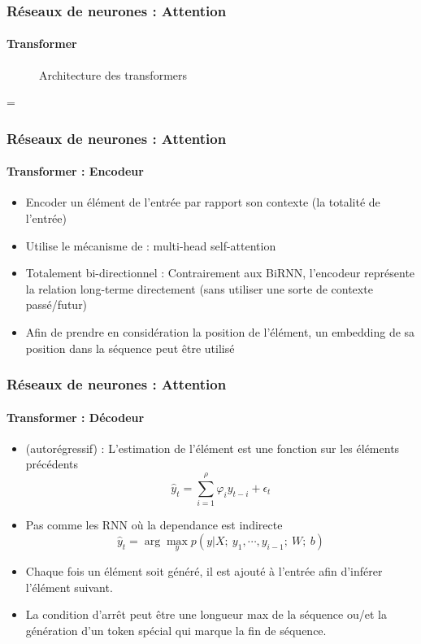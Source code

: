 \documentclass[xcolor=table]{beamer}
\begin{document}
\begin{frame}
	\frametitle{Réseaux de neurones : Attention}
	\framesubtitle{Transformer}

	\begin{minipage}{0.49\textwidth}
		\begin{figure}
			\centering
			\vskip-8pt
			\caption{Architecture des transformers \cite{2017-vaswani-al}}
		\end{figure}
	\end{minipage}
	\begin{minipage}{0.1\textwidth}
		=
	\end{minipage}
	\begin{minipage}{0.39\textwidth}
	\end{minipage}

	
\end{frame}

\begin{frame}
	\frametitle{Réseaux de neurones : Attention}
	\framesubtitle{Transformer : Encodeur}
	
	\begin{itemize}
		\item Encoder un élément de l'entrée par rapport son contexte (la totalité de l'entrée)
		\item Utilise le mécanisme de : multi-head self-attention
		\item Totalement bi-directionnel : Contrairement aux BiRNN, l'encodeur représente la relation long-terme directement (sans utiliser une sorte de contexte passé/futur)
		\item Afin de prendre en considération la position de l'élément, un embedding de sa position dans la séquence peut être utilisé  
	\end{itemize}
	
\end{frame}

\begin{frame}
	\frametitle{Réseaux de neurones : Attention}
	\framesubtitle{Transformer : Décodeur}
	
	\begin{itemize}
		\item {} (autorégressif) : L'estimation de l'élément est une fonction  sur les éléments précédents
		\[\hat{y}_t = \sum_{i = 1}^{\rho} \varphi_{i} y_{t-i} + \epsilon_t\]
		\item Pas comme les RNN où la dependance est indirecte
		\[\hat{y}_t = \arg\max_y p(y | X;\ y_1, \cdots, y_{i-1};\ W;\ b)\]
		\item Chaque fois un élément soit généré, il est ajouté à l'entrée afin d'inférer l'élément suivant.
		\item La condition d'arrêt peut être une longueur max de la séquence ou/et la génération d'un token spécial qui marque la fin de séquence.
	\end{itemize}
	
\end{frame}
\end{document}
